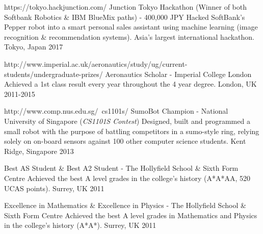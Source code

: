 

\begin{cvhonors}

  \cvhonor
  	{https://tokyo.hackjunction.com/}
    {Junction Tokyo Hackathon (Winner of both Softbank Robotics \& IBM BlueMix paths) - 400,000 JPY} %
    {Hacked SoftBank's Pepper robot into a smart personal sales assistant using machine learning (image recognition \& recommendation systems). Asia's largest international hackathon.} %
    {Tokyo, Japan} %
    {2017} %


  \cvhonor
  	{http://www.imperial.ac.uk/aeronautics/study/ug/current-students/undergraduate-prizes/}
    {Aeronautics Scholar - Imperial College London} %
    {Achieved a 1st class result every year throughout the 4 year degree.} %
    {London, UK} %
    {2011-2015} %

  \cvhonor
  	{http://www.comp.nus.edu.sg/~cs1101s/}
    {SumoBot Champion - National University of Singapore (\emph{CS1101S Contest})} %
    {Designed, built and programmed a small robot with the purpose of battling competitors in a sumo-style ring, relying solely on on-board sensors against 100 other computer science students.} %
    {Kent Ridge, Singapore} %
    {2013} %

  \cvhonor
  	{}
    {Best AS Student \& Best A2 Student - The Hollyfield School \& Sixth Form Centre} %
    {Achieved the best A level grades in the college's history (A*A*AA, 520 UCAS points).} %
    {Surrey, UK} %
    {2011} %

  \cvhonor
  	{}
    {Excellence in Mathematics \& Excellence in Physics - The Hollyfield School \& Sixth Form Centre} %
    {Achieved the best A level grades in Mathematics and Physics in the college's history (A*A*).} %
    {Surrey, UK} %
    {2011} %

\end{cvhonors}